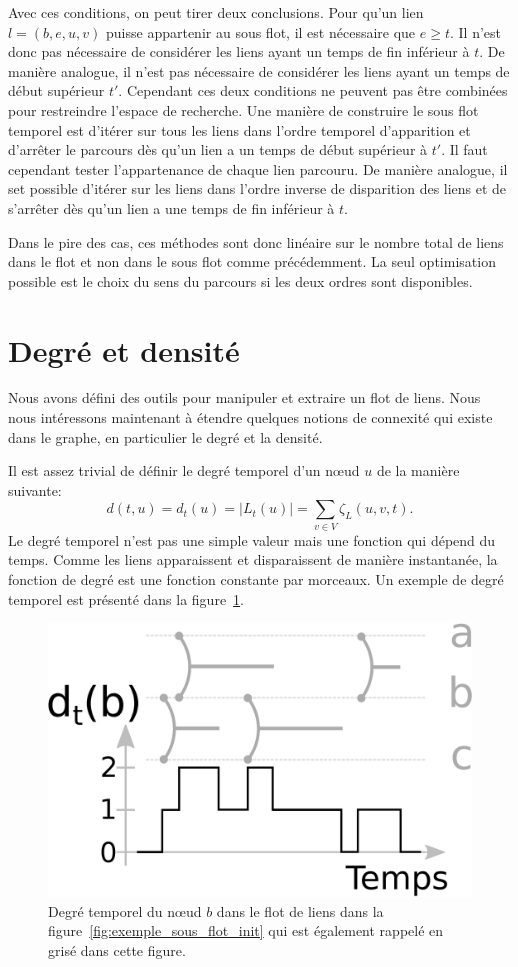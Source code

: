Avec ces conditions, on peut tirer deux conclusions.
Pour qu'un lien $l=(b,e,u,v)$ puisse appartenir au sous flot, il est nécessaire que $e \geq t$.
Il n'est donc pas nécessaire de considérer les liens ayant un temps de fin inférieur à $t$.
De manière analogue, il n'est pas nécessaire de considérer les liens ayant un temps de début supérieur $t'$.
Cependant ces deux conditions ne peuvent pas être combinées pour restreindre l'espace de recherche.
Une manière de construire le sous flot temporel est d'itérer sur tous les liens dans l'ordre temporel d'apparition et d'arrêter le parcours dès qu'un lien a un temps de début supérieur à $t'$.
Il faut cependant tester l'appartenance de chaque lien parcouru.
De manière analogue, il set possible d'itérer sur les liens dans l'ordre inverse de disparition des liens et de s'arrêter dès qu'un lien a une temps de fin inférieur à $t$.


Dans le pire des cas, ces méthodes sont donc linéaire sur le nombre total de liens dans le flot et non dans le sous flot comme précédemment.
La seul optimisation possible est le choix du sens du parcours si les deux ordres sont disponibles.



\section{Degré et densité}
\label{sec:def_densite}
Nous avons défini des outils pour manipuler et extraire un flot de liens.
Nous nous intéressons maintenant à étendre quelques notions de connexité qui existe dans le graphe, en particulier le degré et la densité.

Il est assez trivial de définir le degré temporel d'un n\oe ud $u$ de la manière suivante:
\begin{equation}
d(t,u)=d_t(u)= |L_t(u)|= \sum_{v \in V} \zeta_{L}(u,v,t).
\end{equation}
Le degré temporel n'est pas une simple valeur mais une fonction qui dépend du temps.
Comme les liens apparaissent et disparaissent de manière instantanée, la fonction de degré est une fonction constante par morceaux.
Un exemple de degré temporel est présenté dans la figure~\ref{fig:exemple_degre}.

\begin{figure}
\centering
\includegraphics[width=0.5\linewidth]{img/Intro/degre2.eps}
\caption{Degré temporel du n\oe ud $b$ dans le flot de liens dans la figure~\ref{fig:exemple_sous_flot_init} qui est également rappelé en grisé dans cette figure.
}
\label{fig:exemple_degre}
\end{figure}

